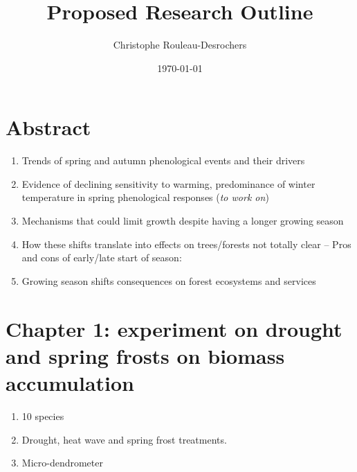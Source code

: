 \documentclass{article}
\title{Proposed Research Outline}
\date{\today}
\author{Christophe Rouleau-Desrochers}
\begin{document}

\maketitle


\section{Abstract}
\begin {enumerate}
	\item Trends of spring and autumn phenological events and their drivers \citep{walther_ecological_2002}
	\item Evidence of declining sensitivity to warming, predominance of winter temperature in spring phenological responses (\textit{to work on}) \citep{ettinger_winter_2020}
	\item Mechanisms that could limit growth despite having a longer growing season
	\item How these shifts translate into effects on trees/forests not totally clear -- Pros and cons of early/late start of season:
	\item Growing season shifts consequences on forest ecosystems and services
\end {enumerate}

\section*{Chapter 1: experiment on drought and spring frosts on biomass accumulation}
\begin {enumerate}
	\item 10 species 
	\item Drought, heat wave and spring frost treatments. 
	\item Micro-dendrometer 
\end {enumerate}

\end{document}
